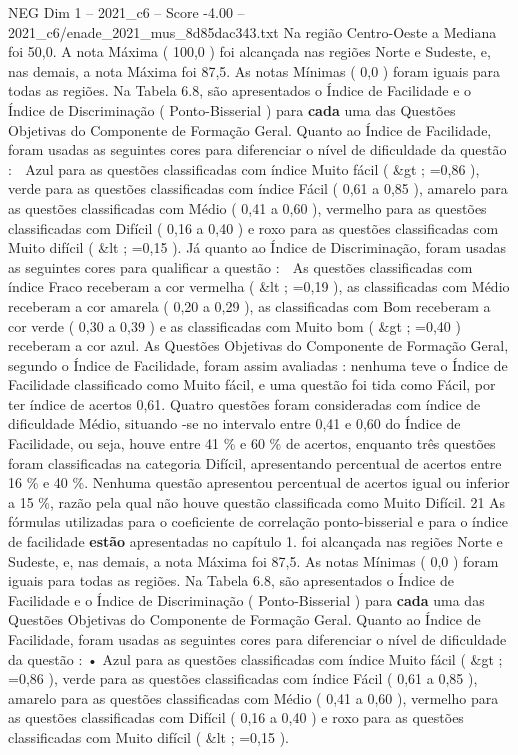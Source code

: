 \begin{textsample}{NEG Dim 1 – 2021\_c6 – Score -4.00 – 2021\_c6/enade\_2021\_mus\_8d85dac343.txt}
Na região Centro-Oeste a Mediana foi 50,0.
A nota Máxima ( 100,0 ) foi alcançada nas regiões Norte e Sudeste, e, nas demais, a nota Máxima foi 87,5.
As notas Mínimas ( 0,0 ) foram iguais para todas as regiões.
Na Tabela 6.8, são apresentados o Índice de Facilidade e o Índice de Discriminação ( Ponto-Bisserial ) para \textbf{cada} uma das Questões Objetivas do Componente de Formação Geral.
Quanto ao Índice de Facilidade, foram usadas as seguintes cores para diferenciar o nível de dificuldade da questão :  Azul para as questões classificadas com índice Muito fácil ( \&gt ; =0,86 ), verde para as questões classificadas com índice Fácil ( 0,61 a 0,85 ), amarelo para as questões classificadas com Médio ( 0,41 a 0,60 ), vermelho para as questões classificadas com Difícil ( 0,16 a 0,40 ) e roxo para as questões classificadas com Muito difícil ( \&lt ; =0,15 ).
Já quanto ao Índice de Discriminação, foram usadas as seguintes cores para qualificar a questão :  As questões classificadas com índice Fraco receberam a cor vermelha ( \&lt ; =0,19 ), as classificadas com Médio receberam a cor amarela ( 0,20 a 0,29 ), as classificadas com Bom receberam a cor verde ( 0,30 a 0,39 ) e as classificadas com Muito bom ( \&gt ; =0,40 ) receberam a cor azul.
As Questões Objetivas do Componente de Formação Geral, segundo o Índice de Facilidade, foram assim avaliadas : nenhuma teve o Índice de Facilidade classificado como Muito fácil, e uma questão foi tida como Fácil, por ter índice de acertos 0,61.
Quatro questões foram consideradas com índice de dificuldade Médio, situando -se no intervalo entre 0,41 e 0,60 do Índice de Facilidade, ou seja, houve entre 41 \% e 60 \% de acertos, enquanto três questões foram classificadas na categoria Difícil, apresentando percentual de acertos entre 16 \% e 40 \%.
Nenhuma questão apresentou percentual de acertos igual ou inferior a 15 \%, razão pela qual não houve questão classificada como Muito Difícil. 21 As fórmulas utilizadas para o coeficiente de correlação ponto-bisserial e para o índice de facilidade \textbf{estão} apresentadas no capítulo 1. foi alcançada nas regiões Norte e Sudeste, e, nas demais, a nota Máxima foi 87,5.
As notas Mínimas ( 0,0 ) foram iguais para todas as regiões.
Na Tabela 6.8, são apresentados o Índice de Facilidade e o Índice de Discriminação ( Ponto-Bisserial ) para \textbf{cada} uma das Questões Objetivas do Componente de Formação Geral.
Quanto ao Índice de Facilidade, foram usadas as seguintes cores para diferenciar o nível de dificuldade da questão : • Azul para as questões classificadas com índice Muito fácil ( \&gt ; =0,86 ), verde para as questões classificadas com índice Fácil ( 0,61 a 0,85 ), amarelo para as questões classificadas com Médio ( 0,41 a 0,60 ), vermelho para as questões classificadas com Difícil ( 0,16 a 0,40 ) e roxo para as questões classificadas com Muito difícil ( \&lt ; =0,15 ).

\end{textsample}
